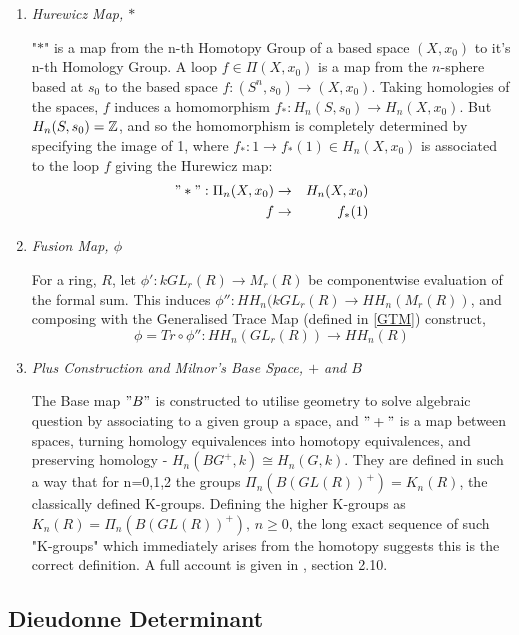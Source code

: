 \begin{enumerate}
\item \textit{Hurewicz Map, $*$}

"$*$" is a map from the n-th Homotopy Group of a based space $(X,x_0)$ to it's n-th Homology Group. A loop $f\in \Pi(X,x_0)$ is a map from the $n$-sphere based at $s_0$ to the based space $f: (S^n,s_0)\rightarrow (X,x_0)$. Taking homologies of the spaces, $f$ induces a homomorphism $f_*:H_n(S,s_0)\rightarrow H_n(X,x_0)$. But $H_n(S,s_0) = \mathbb Z$, and so the homomorphism is completely determined by specifying the image of 1, where $f_*:1\rightarrow f_*(1) \in H_n(X,x_0)$ is associated to the loop $f$ giving the Hurewicz map:
\begin{eqnarray}
\nonumber "*": \Pi_n(X,x_0) &\rightarrow& H_n(X,x_0)\\
\nonumber          f &\rightarrow& f_*(1)
\end{eqnarray}

\item  \textit{Fusion Map, $\phi$}

For a ring, $R$, let $\phi':kGL_r(R)\rightarrow M_r(R)$ be componentwise evaluation of the formal sum. This induces $\phi'':HH_n(kGL_r(R)\rightarrow HH_n(M_r(R))$, and composing with the Generalised Trace Map (defined in \ref{GTM}) construct,
$$\phi = Tr\circ \phi'' :HH_n(GL_r(R))\rightarrow HH_n(R)$$

\item \textit{Plus Construction and Milnor's Base Space, $+$ and $B$}

The Base map $"B"$ is constructed to utilise geometry to solve algebraic question by associating to a given group a space,  and $"+"$ is a map between spaces, turning homology equivalences into homotopy equivalences, and preserving homology - $H_n(BG^+,k)\cong H_n(G,k)$. They are defined in such a way that for n=0,1,2 the groups $\Pi_n(B(GL(R))^+) = K_n(R)$, the classically defined K-groups. Defining the higher K-groups as $K_n(R) = \Pi_n(B(GL(R))^+),\, n\geq 0$, the long exact sequence of such "K-groups" which immediately arises from the homotopy suggests this is the correct definition. A full account is given in \cite{B}, section 2.10.
\end{enumerate}




\subsection{Dieudonne Determinant\label{DD}}


